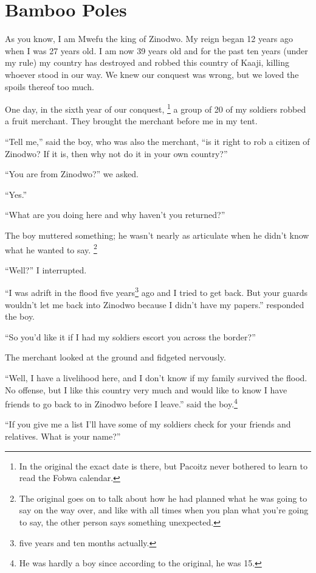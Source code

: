 \chapter{Bamboo Poles}

As you know, I am Mwe\-fu the king of Zi\-no\-dwo. My reign began 12 years ago when I was 27 years old. I am now 39 years old and for the past ten years (under my rule) my country has destroyed and robbed this country of Kaa\-ji, killing whoever stood in our way.
We knew our conquest was wrong, but we loved the spoils thereof too much.

One day, in the sixth year of our conquest,
\footnote{In the original the exact date is there, but Pa\-co\-itz never bothered to learn to read the Fo\-bwa calendar.}
a group of 20 of my soldiers robbed a fruit merchant. They brought the merchant before me in my tent.

``Tell me,'' said the boy, who was also the merchant, ``is it right to rob a citizen of Zi\-no\-dwo? If it is, then why not do it in your own country?''

``You are from Zi\-no\-dwo?'' we asked.

``Yes.''

``What are you doing here and why haven't you returned?''

The boy muttered something; he wasn't nearly as articulate when he didn't know what he wanted to say. \footnote{The original goes on to talk about how he had planned what he was going to say on the way over, and like with all times when you plan what you're going to say, the other person says something unexpected.}

``Well?'' I interrupted.

``I was adrift in the flood five years\footnote{five years and ten months actually.} ago and I tried to get back.
But your guards wouldn't let me back into Zi\-no\-dwo because I didn't have my papers.'' responded the boy.

``So you'd like it if I had my soldiers escort you across the border?''

The merchant looked at the ground and fidgeted nervously.

``Well, I have a livelihood here, and I don't know if my family survived the flood.
No offense, but I like this country very much and would like to know I have friends to go back to in Zi\-no\-dwo before I leave.'' said the boy.\footnote{He was hardly a boy since according to the original, he was 15.}

``If you give me a list I'll have some of my soldiers check for your friends and relatives. What is your name?''

